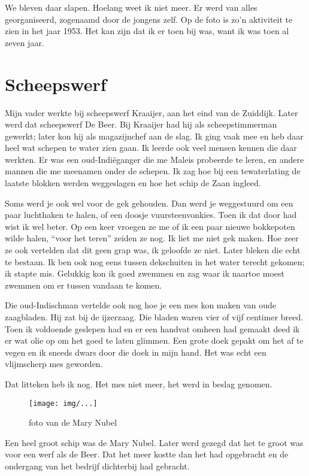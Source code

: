 \documentclass[10pt,twoside,openright]{memoir}
\begin{document}
We bleven daar slapen. Hoelang weet ik niet meer. Er werd van alles georganiseerd, zogenaamd door de jongens zelf. Op de foto is zo’n aktiviteit te zien in het jaar 1953. Het kan zijn dat ik er toen bij was, want ik was toen al zeven jaar.

\chapter{Scheepswerf} %
\label{cha:scheepswerf}

Mijn vader werkte bij scheepswerf Kraaijer, aan het eind van de Zuiddijk. Later werd dat scheepswerf De Beer. Bij Kraaijer had hij als scheepstimmerman gewerkt; later kon hij als magazijnchef aan de slag. Ik ging vaak mee en heb daar heel wat schepen te water zien gaan. Ik leerde ook veel mensen kennen die daar werkten. Er was een oud-Indiëganger die me Maleis probeerde te leren, en andere mannen die me meenamen onder de schepen. Ik zag hoe bij een tewaterlating de laatste blokken werden weggeslagen en hoe het schip de Zaan ingleed. 

Soms werd je ook wel voor de gek gehouden. Dan werd je weggestuurd om een paar luchthaken te halen, of een doosje vuursteenvonkies. Toen ik dat door had wist ik wel beter. Op een keer vroegen ze me of ik een paar nieuwe bokkepoten wilde halen, ``voor het teren'' zeiden ze nog. Ik liet me niet gek maken. Hoe zeer ze ook vertelden dat dit geen grap was, ik geloofde ze niet. Later bleken die echt te bestaan. Ik ben ook nog eens tussen dekschuiten in het water terecht gekomen; ik stapte mis. Gelukkig kon ik goed zwemmen en zag waar ik naartoe moest zwemmen om er tussen vandaan te komen. 

Die oud-Indischman vertelde ook nog hoe je een mes kon maken van oude zaagbladen. Hij zat bij de ijzerzaag. Die bladen waren vier of vijf centimer breed. Toen ik voldoende geslepen had en er een handvat omheen had gemaakt deed ik er wat olie op om het goed te laten glimmen. Een grote doek gepakt om het af te vegen en ik sneeds dwars door die doek in mijn hand. Het was echt een vlijmscherp mes geworden. 

Dat litteken heb ik nog. Het mes niet meer, het werd in beslag genomen.

\begin{figure}[t]
\texttt{[image: img/...]}
\caption{foto van de Mary Nubel}
\end{figure}

Een heel groot schip was de Mary Nubel. Later werd gezegd dat het te groot was voor een werf als de Beer. Dat het meer kostte dan het had opgebracht en de ondergang van het bedrijf dichterbij had gebracht. 
\end{document}
